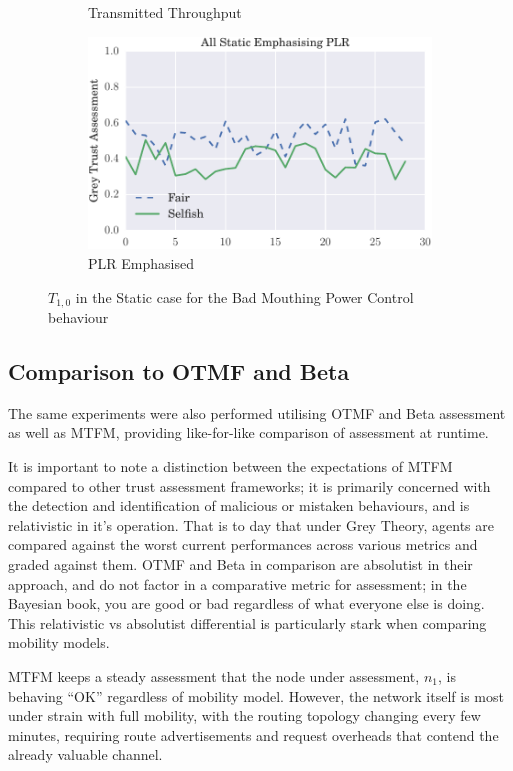 \documentclass[runningheads,a4paper]{llncs}
\begin{document}
{{\begin{figure}
\begin{subfigure}{0.5\textwidth}
  \caption{Transmitted Throughput}
  \label{fig:beta_trust_all_mobile}
\end{subfigure}
\begin{subfigure}{0.5\textwidth}
\centering
  \includegraphics[width=.8\linewidth]{img/trust_bella_static_emph_PLR_BadMouthingPowerControl.pdf}
  \caption{PLR Emphasised}
  \label{fig:beta_trust_all_mobile}
\end{subfigure}
\caption{$T_{1,0}$ in the Static case for the Bad Mouthing Power Control behaviour}
\label{fig:trust_mobility}
\end{figure}





\subsection{Comparison to OTMF and Beta}

The same experiments were also performed utilising OTMF and Beta assessment as well as MTFM, providing like-for-like comparison of assessment at runtime.

It is important to note a distinction between the expectations of MTFM compared to other trust assessment frameworks; it is primarily concerned with the detection and identification of malicious or mistaken behaviours, and is relativistic in it's operation.
That is to day that under Grey Theory, agents are compared against the worst current performances across various metrics and graded against them.
OTMF and Beta in comparison are absolutist in their approach, and do not factor in a comparative metric for assessment; in the Bayesian book, you are good or bad regardless of what everyone else is doing. 
This relativistic vs absolutist differential is particularly stark when comparing mobility models. 

MTFM keeps a steady assessment that the node under assessment, $n_1$, is behaving ``OK'' regardless of mobility model. 
However, the network itself is most under strain with full mobility, with the routing topology changing every few minutes, requiring route advertisements and request overheads that contend the already valuable channel.

}}
\end{document}
